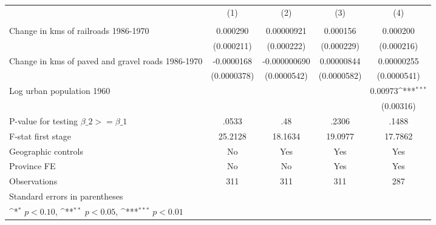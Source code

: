 {
\def\sym#1{\ifmmode^{#1}\else\(^{#1}\)\fi}
\begin{tabular}{l*{4}{c}}
\hline\hline
                &\multicolumn{1}{c}{(1)}&\multicolumn{1}{c}{(2)}&\multicolumn{1}{c}{(3)}&\multicolumn{1}{c}{(4)}\\
                &\multicolumn{1}{c}{}&\multicolumn{1}{c}{}&\multicolumn{1}{c}{}&\multicolumn{1}{c}{}\\
\hline
Change in kms of railroads 1986-1970& 0.000290         &0.00000921         & 0.000156         & 0.000200         \\
                &(0.000211)         &(0.000222)         &(0.000229)         &(0.000216)         \\
[1em]
Change in kms of paved and gravel roads 1986-1970&-0.0000168         &-0.000000690         &0.00000844         &0.00000255         \\
                &(0.0000378)         &(0.0000542)         &(0.0000582)         &(0.0000541)         \\
[1em]
Log urban population 1960&                  &                  &                  &  0.00973\sym{***}\\
                &                  &                  &                  &(0.00316)         \\
\hline
P-value for testing $\beta\_{2} >= \beta\_{1}$&    .0533         &      .48         &    .2306         &    .1488         \\
F-stat first stage&  25.2128         &  18.1634         &  19.0977         &  17.7862         \\
Geographic controls&       No         &      Yes         &      Yes         &      Yes         \\
Province FE     &       No         &       No         &      Yes         &      Yes         \\
Observations    &      311         &      311         &      311         &      287         \\
\hline\hline
\multicolumn{5}{l}{\footnotesize Standard errors in parentheses}\\
\multicolumn{5}{l}{\footnotesize \sym{*} \(p<0.10\), \sym{**} \(p<0.05\), \sym{***} \(p<0.01\)}\\
\end{tabular}
}
